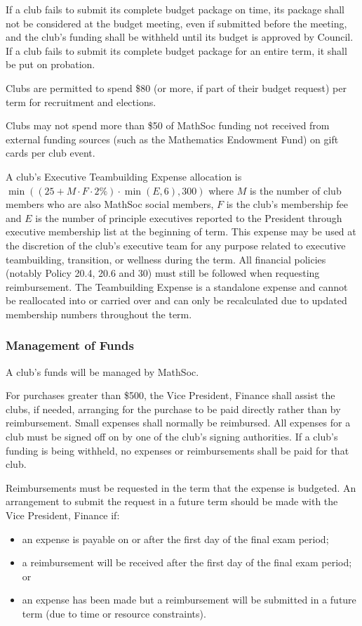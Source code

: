 If a club fails to submit its complete budget package on time, its package shall
not be considered at the budget meeting, even if submitted before the meeting,
and the club's funding shall be withheld until its budget is approved by
Council. If a club fails to submit its complete budget package for an entire
term, it shall be put on probation.

Clubs are permitted to spend \$80 (or more, if part of their budget request) per
term for recruitment and elections.

Clubs may not spend more than \$50 of MathSoc funding not received from external funding sources (such as the Mathematics Endowment Fund) on gift cards per club event.

A club’s Executive Teambuilding Expense allocation is $\min((25+M\cdot F\cdot 2\%)\cdot \min(E,6), 300)$ where $M$ is the number of club members who are also MathSoc social members, $F$ is the club’s membership fee and $E$ is the number of principle executives reported to the President through executive membership list at the beginning of term. This expense may be used at the discretion of the club’s executive team for any purpose related to executive teambuilding, transition, or wellness during the term. All financial policies (notably Policy 20.4, 20.6 and 30) must still be followed when requesting reimbursement. The Teambuilding Expense is a standalone expense and cannot be reallocated into or carried over and can only be recalculated due to updated membership numbers throughout the term.

\subsubsection{Management of Funds}
A club's funds will be managed by MathSoc.

For purchases greater than \$500, the Vice President, Finance shall assist the clubs, if needed,
arranging for the purchase to be paid directly rather than by reimbursement.
Small expenses shall normally be reimbursed. All expenses for a club must be
signed off on by one of the club's signing authorities. If a club's funding is
being withheld, no expenses or reimbursements shall be paid for that club.

Reimbursements must be requested in the term that the expense is budgeted. 
An arrangement to submit the request in a future term should be made with
the Vice President, Finance if:
\begin{itemize}
	\item an expense is payable on or after the first day of the final exam period;
	\item a reimbursement will be received after the first day of the final exam period; or
	\item an expense has been made but a reimbursement will be submitted in a 
	future term (due to time or resource constraints).
\end{itemize}

